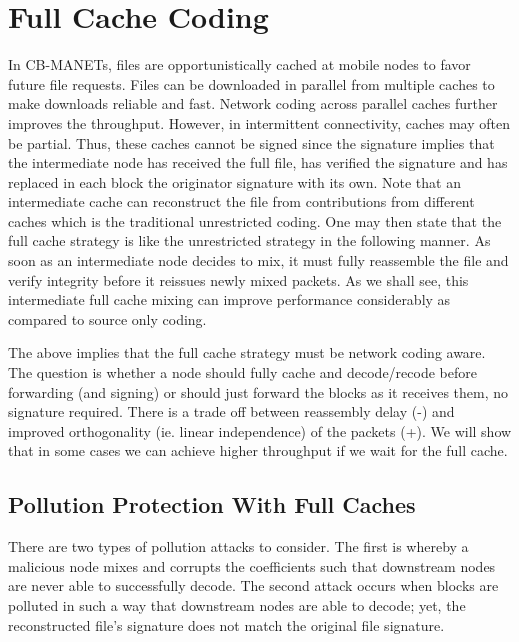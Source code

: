 \section{Full Cache Coding}
In CB-MANETs, files are opportunistically cached at mobile nodes to favor future file requests. Files can be downloaded in parallel from multiple caches to make downloads reliable and fast. Network coding across parallel caches further improves the throughput. However, in intermittent connectivity, caches may often be partial. Thus, these caches cannot be signed since the signature implies that the intermediate node has received the full file, has verified the signature and has replaced in each block the originator signature with its own.  Note that an intermediate cache can reconstruct the file from contributions from different caches which is the traditional unrestricted coding. One may then state that the full cache strategy is like the unrestricted strategy in the following manner. As soon as an intermediate node decides to mix, it must fully reassemble the file and verify integrity before it reissues newly mixed packets. As we shall see, this intermediate full cache mixing can improve performance considerably as compared to source only coding.

The above implies that  the full cache strategy must be network coding aware. The question is whether a node should fully cache and decode/recode before forwarding (and signing) or should just forward the blocks as it receives them, no signature required.  There is a trade off between reassembly delay (-) and improved orthogonality (ie. linear independence) of the packets (+). We will show that in some cases we  can achieve higher throughput if we wait for the full cache. 

\subsection{Pollution Protection With Full Caches}
There are two types of pollution attacks to consider. The first is whereby a malicious node mixes and corrupts the coefficients such that downstream nodes are never able to successfully decode. The second attack occurs when blocks are polluted in such a way that downstream nodes are able to decode; yet, the reconstructed file's signature does not match the original file signature.

